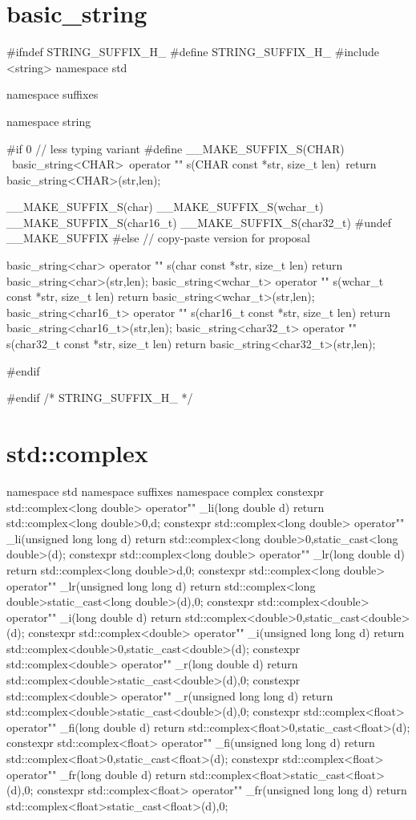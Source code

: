 \documentclass[ebook,11pt,article]{memoir}
\begin{document}
\section{basic_string}
\begin{codeblock}
#ifndef STRING_SUFFIX_H_
#define STRING_SUFFIX_H_
#include <string>
namespace std{
namespace suffixes{
namespace string{
#if 0 // less typing variant
#define __MAKE_SUFFIX_S(CHAR) \
	basic_string<CHAR>\
operator "" s(CHAR const *str, size_t len){\
	return basic_string<CHAR>(str,len);\
}

__MAKE_SUFFIX_S(char)
__MAKE_SUFFIX_S(wchar_t)
__MAKE_SUFFIX_S(char16_t)
__MAKE_SUFFIX_S(char32_t)
#undef __MAKE_SUFFIX
#else // copy-paste version for proposal

basic_string<char>
operator "" s(char const *str, size_t len){
    return basic_string<char>(str,len);
}
basic_string<wchar_t>
operator "" s(wchar_t const *str, size_t len){
    return basic_string<wchar_t>(str,len);
}
basic_string<char16_t>
operator "" s(char16_t const *str, size_t len){
    return basic_string<char16_t>(str,len);
}
basic_string<char32_t>
operator "" s(char32_t const *str, size_t len){
    return basic_string<char32_t>(str,len);
}

#endif
}
}
}
#endif /* STRING_SUFFIX_H_ */
\end{codeblock}
\section{std::complex}
\begin{codeblock}
namespace std{
namespace suffixes{
namespace complex{
constexpr
std::complex<long double> operator"" _li(long double d){
	return std::complex<long double>{0,d};
}
constexpr
std::complex<long double> operator"" _li(unsigned long long d){
	return std::complex<long double>{0,static_cast<long double>(d)};
}
constexpr
std::complex<long double> operator"" _lr(long double d){
	return std::complex<long double>{d,0};
}
constexpr
std::complex<long double> operator"" _lr(unsigned long long d){
	return std::complex<long double>{static_cast<long double>(d),0};
}
constexpr
std::complex<double> operator"" _i(long double d){
	return std::complex<double>{0,static_cast<double>(d)};
}
constexpr
std::complex<double> operator"" _i(unsigned long long d){
	return std::complex<double>{0,static_cast<double>(d)};
}
constexpr
std::complex<double> operator"" _r(long double d){
	return std::complex<double>{static_cast<double>(d),0};
}
constexpr
std::complex<double> operator"" _r(unsigned long long d){
	return std::complex<double>{static_cast<double>(d),0};
}
constexpr
std::complex<float> operator"" _fi(long double d){
	return std::complex<float>{0,static_cast<float>(d)};
}
constexpr
std::complex<float> operator"" _fi(unsigned long long d){
	return std::complex<float>{0,static_cast<float>(d)};
}
constexpr
std::complex<float> operator"" _fr(long double d){
	return std::complex<float>{static_cast<float>(d),0};
}
constexpr
std::complex<float> operator"" _fr(unsigned long long d){
	return std::complex<float>{static_cast<float>(d),0};
}
}
}
}
\end{codeblock}
\end{document}
